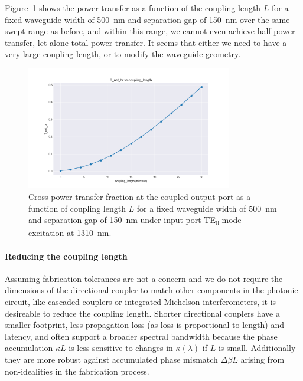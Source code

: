 \documentclass[10pt, a4paper]{article}
\begin{document}
Figure~\ref{fig:coupling_length_1310} shows the power transfer as a function of the coupling length \(L\) for a fixed waveguide width of \SI{500}{\nm} and separation gap of \SI{150}{\nm} over the same swept range as before,
and within this range, we cannot even achieve half-power transfer,
let alone total power transfer. It seems that either we need to have a very large coupling length,
or to modify the waveguide geometry.

\begin{figure}[h!]
  \centering
  \includegraphics[width=0.8\textwidth]{task3/sweep_plots/sweep_idx_1_sweep__coupling_length=0_30_15,_center_wavelength=1.31_T_net_br_line.png}
  \caption{Cross-power transfer fraction at the coupled output port as a function of coupling length \(L\) for a fixed waveguide width of \SI{500}{\nm} and separation gap of \SI{150}{\nm} under input port TE\textsubscript{0} mode excitation at \SI{1310}{\nm}.}
  \label{fig:coupling_length_1310}
\end{figure}

\paragraph{Reducing the coupling length}
Assuming fabrication tolerances are not a concern
and we do not require the dimensions of the directional coupler to match other components in the photonic circuit, like cascaded couplers or integrated Michelson interferometers, it is desireable to reduce the coupling length.
Shorter directional couplers have a smaller footprint,
less propagation loss (as loss is proportional to length) and latency,
and often support a broader spectral bandwidth because the phase accumulation \(\kappa L\) is less sensitive to changes in \(\kappa(\lambda)\) if \(L\) is small.
Additionally they are more robust against accumulated phase mismatch \(\Delta\beta L\) arising from non-idealities in the fabrication process.
\end{document}
